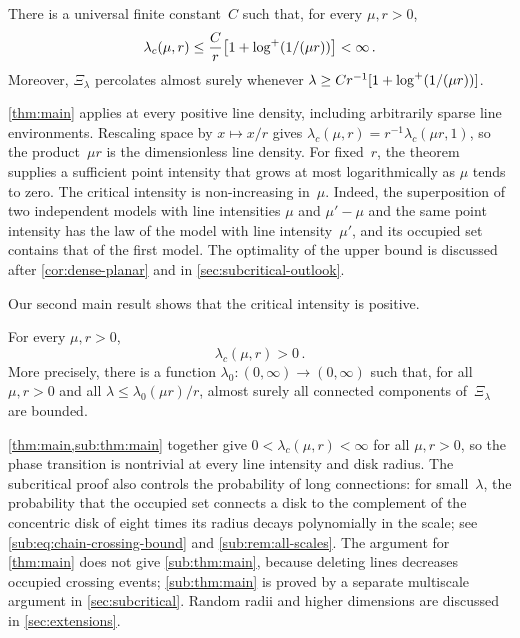 \documentclass[11pt,letterpaper]{article}
\begin{document}
\begin{theorem}
\label{thm:main}
There is a universal finite constant~$C$ such that, for every $\mu,r>0$,
\begin{equation*}
  \lambda_c(\mu,r)\le\frac{C}{r}\bigl[1+\log^{+}(1/(\mu r))\bigr]<\infty\,.
\end{equation*}
Moreover, $\Xi_\lambda$ percolates almost surely whenever $\lambda\ge Cr^{-1}[1+\log^{+}(1/(\mu r))]$.
\end{theorem}

\cref{thm:main} applies at every positive line density, including arbitrarily sparse line environments. Rescaling space by $x\mapsto x/r$ gives $\lambda_c(\mu,r)=r^{-1}\lambda_c(\mu r,1)$, so the product~$\mu r$ is the dimensionless line density. For fixed~$r$, the theorem supplies a sufficient point intensity that grows at most logarithmically as $\mu$ tends to zero. The critical intensity is non-increasing in~$\mu$. Indeed, the superposition of two independent models with line intensities $\mu$ and $\mu'-\mu$ and the same point intensity has the law of the model with line intensity~$\mu'$, and its occupied set contains that of the first model. The optimality of the upper bound is discussed after \cref{cor:dense-planar} and in \cref{sec:subcritical-outlook}.

Our second main result shows that the critical intensity is positive.

\begin{theorem}
\label{sub:thm:main}
For every $\mu,r>0$,
\begin{equation*}
  \lambda_c(\mu,r)>0\,.
\end{equation*}
More precisely, there is a function $\lambda_0\colon(0,\infty)\to(0,\infty)$ such that, for all $\mu,r>0$ and all $\lambda\le\lambda_0(\mu r)/r$, almost surely all connected components of~$\Xi_\lambda$ are bounded.
\end{theorem}

\cref{thm:main,sub:thm:main} together give $0<\lambda_c(\mu,r)<\infty$ for all $\mu,r>0$, so the phase transition is nontrivial at every line intensity and disk radius. The subcritical proof also controls the probability of long connections: for small~$\lambda$, the probability that the occupied set connects a disk to the complement of the concentric disk of eight times its radius decays polynomially in the scale; see \eqref{sub:eq:chain-crossing-bound} and \cref{sub:rem:all-scales}. The argument for \cref{thm:main} does not give \cref{sub:thm:main}, because deleting lines decreases occupied crossing events; \cref{sub:thm:main} is proved by a separate multiscale argument in \cref{sec:subcritical}. Random radii and higher dimensions are discussed in \cref{sec:extensions}.
\end{document}
